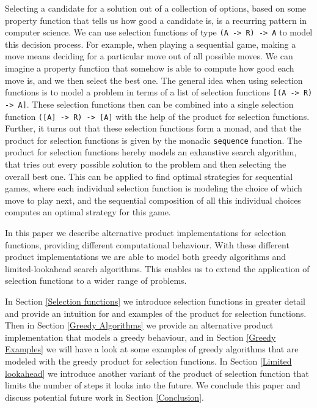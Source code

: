 \documentclass[runningheads]{llncs}
\begin{document}
Selecting a candidate for a solution out of a collection of options, based on some property function that tells us how good a candidate is, is a recurring pattern in computer science. We can use selection functions of type \texttt{(A -> R) -> A} to model this decision process. For example, when playing a sequential game, making a move means deciding for a particular move out of all possible moves. We can imagine a property function that somehow is able to compute how good each move is, and we then select the best one.
The general idea when using selection functions is to model a problem in terms of a list of selection functions \texttt{[(A -> R) -> A]}. These selection functions then can be combined into a single selection function \texttt{([A] -> R) -> [A]} with the help of the product for selection functions. Further, it turns out that these selection functions form a monad, and that the product for selection functions is given by the monadic \texttt{sequence} function. The product for selection functions hereby models an exhaustive search algorithm, that tries out every possible solution to the problem and then selecting the overall best one. This can be applied to find optimal strategies for sequential games, where each individual selection function is modeling the choice of which move to play next, and the sequential composition of all this individual choices computes an optimal strategy for this game.

In this paper we describe alternative product implementations for selection functions, providing different computational behaviour. With these different product implementations we are able to model both greedy algorithms and limited-lookahead search algorithms. This enables us to extend the application of selection functions to a wider range of problems. 

In Section \ref{Selection functions} we introduce selection functions in greater detail and provide an intuition for and examples of the product for selection functions. Then in Section \ref{Greedy Algorithms} we provide an alternative product implementation that models a greedy behaviour, and in Section \ref{Greedy Examples} we will have a look at some examples of greedy algorithms that are modeled with the greedy product for selection functions. In Section \ref{Limited lookahead} we introduce another variant of the product of selection function that limits the number of steps it looks into the future.
We conclude this paper and discuss potential future work in Section \ref{Conclusion}.
\end{document}
